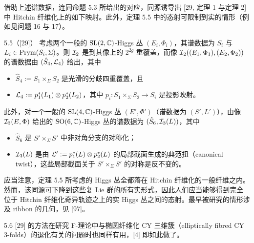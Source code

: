 借助上述谱数据，连同命题 5.3 所给出的对应，同源诱导出 [29, 定理 1 与定理 2] 中 Hitchin 纤维化上的如下映射。此外，定理 5.5 中的态射可限制到实的情形（例如见问题 16 与 17）。

\begin{thm}{5.5（[29]）}
考虑两个一般的 $\mathrm{SL}(2,\mathbb{C})$-Higgs 丛 $(E_i,\Phi_i)$，其谱数据为 $S_i$ 与 $L_i\in\operatorname{Prym}(S_i,\Sigma)$。则 $\mathcal{I}_2$ 是到其像上的 $2^{2g}$ 重覆盖，而像 $\mathcal{I}_2((E_1,\Phi_1),(E_2,\Phi_2))$ 的谱数据由 $(\hat S_4,\mathcal{L}_4)$ 给出，其中
\begin{itemize}[leftmargin=1.4em,itemsep=1pt,topsep=1pt]
\item $\hat S_4 := S_1\times_{\Sigma}S_2$ 是光滑的分歧四重覆盖，且
\item $\mathcal{L}_4 := p_1^*(L_1)\otimes p_2^*(L_2)$，其中 $p_i : S_1\times_{\Sigma}S_2\to S_i$ 是投影映射。
\end{itemize}
此外，对一个一般的 $\mathrm{SL}(4,\mathbb{C})$-Higgs 丛 $(E',\Phi')$（谱数据为 $(S',L')$），由像 $\mathcal{I}_3(E,\Phi)$ 给出的 $\mathrm{SO}(6,\mathbb{C})$-Higgs 丛的谱数据为 $(\hat S_6,\mathcal{I}_3(L))$，其中
\begin{itemize}[leftmargin=1.4em,itemsep=1pt,topsep=1pt]
\item $\hat S_6$ 是 $S'\times_{\Sigma}S'$ 中非对角分支的对称化；
\item $\mathcal{I}_3(L)$ 是由 $\mathcal{L}' := p_1^*(L)\otimes p_2^*(L)$ 的局部截面生成的典范扭（canonical twist），这些局部截面关于 $S'\times_{\Sigma}S'$ 的对称是反不变的。
\end{itemize}
\end{thm}


应当注意，定理 5.5 所考虑的 Higgs 丛全都落在 Hitchin 纤维化的一般纤维之内。然而，该同源可下降到这些复 Lie 群的所有实形式，因此人们应当能够得到完全位于 Hitchin 纤维化奇异轨迹之上的实 Higgs 丛之间的态射。最早被研究的情形涉及 ribbon 的几何，见 [97]。

\begin{rem}{5.6}
[29] 的方法在研究 F-理论中与椭圆纤维化 CY 三维簇（elliptically fibred CY 3-folds）的退化有关的问题时也同样有用，[4] 即如此做了。
\end{rem}

